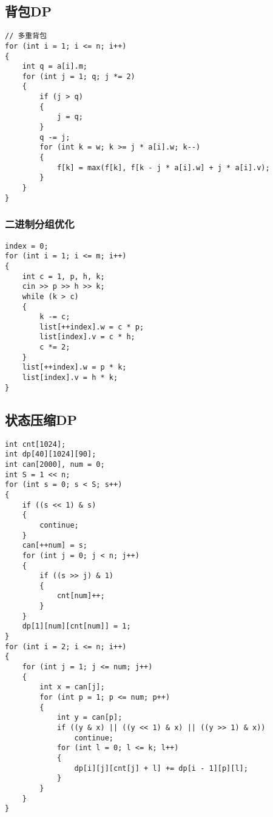\documentclass[]{article}
\begin{document}
\hypertarget{ux80ccux5305dp}{%
\subsection{背包DP}\label{ux80ccux5305dp}}

\begin{verbatim}
// 多重背包
for (int i = 1; i <= n; i++)
{
    int q = a[i].m;
    for (int j = 1; q; j *= 2)
    {
        if (j > q)
        {
            j = q;
        }
        q -= j;
        for (int k = w; k >= j * a[i].w; k--)
        {
            f[k] = max(f[k], f[k - j * a[i].w] + j * a[i].v);
        }
    }
}
\end{verbatim}

\hypertarget{ux4e8cux8fdbux5236ux5206ux7ec4ux4f18ux5316}{%
\subsubsection{二进制分组优化}\label{ux4e8cux8fdbux5236ux5206ux7ec4ux4f18ux5316}}

\begin{verbatim}
index = 0;
for (int i = 1; i <= m; i++)
{
    int c = 1, p, h, k;
    cin >> p >> h >> k;
    while (k > c)
    {
        k -= c;
        list[++index].w = c * p;
        list[index].v = c * h;
        c *= 2;
    }
    list[++index].w = p * k;
    list[index].v = h * k;
}
\end{verbatim}

\hypertarget{ux72b6ux6001ux538bux7f29dp}{%
\subsection{状态压缩DP}\label{ux72b6ux6001ux538bux7f29dp}}

\begin{verbatim}
int cnt[1024];
int dp[40][1024][90];
int can[2000], num = 0;
int S = 1 << n;
for (int s = 0; s < S; s++)
{
    if ((s << 1) & s)
    {
        continue;
    }
    can[++num] = s;
    for (int j = 0; j < n; j++)
    {
        if ((s >> j) & 1)
        {
            cnt[num]++;
        }
    }
    dp[1][num][cnt[num]] = 1;
}
for (int i = 2; i <= n; i++)
{
    for (int j = 1; j <= num; j++)
    {
        int x = can[j];
        for (int p = 1; p <= num; p++)
        {
            int y = can[p];
            if ((y & x) || ((y << 1) & x) || ((y >> 1) & x))
                continue;
            for (int l = 0; l <= k; l++)
            {
                dp[i][j][cnt[j] + l] += dp[i - 1][p][l];
            }
        }
    }
}
\end{verbatim}
\end{document}
